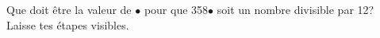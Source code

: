 %
%
	Que doit être la valeur de $\bullet$ pour que 358$\bullet$ soit un nombre divisible par 12? Laisse tes étapes visibles.
